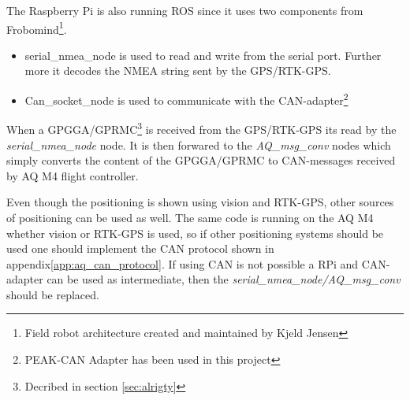 The Raspberry Pi is also running ROS since it uses two components from Frobomind\footnote{Field robot architecture created and maintained by Kjeld Jensen}. \begin{itemize}
	\item serial\_nmea\_node is used to read and write from the serial port. Further more it decodes the NMEA string sent by the GPS/RTK-GPS.
	\item Can\_socket\_node is used to communicate with the CAN-adapter\footnote{PEAK-CAN Adapter has been used in this project}
\end{itemize}

When a GPGGA/GPRMC\footnote{Decribed in section \ref{sec:alrigty}} is received from the GPS/RTK-GPS its read by the \textit{serial\_nmea\_node} node. It is then forwared to the \textit{AQ\_msg\_conv} nodes which simply converts the content of the GPGGA/GPRMC to CAN-messages received by AQ M4 flight controller.

Even though the positioning is shown using vision and RTK-GPS, other sources of positioning can be used as well. The same code is running on the AQ M4 whether vision or RTK-GPS is used, so if other positioning systems should be used one should implement the CAN protocol shown in appendix\ref{app:aq_can_protocol}. If using CAN is not possible a RPi and CAN-adapter can be used as intermediate, then the \textit{serial\_nmea\_node/AQ\_msg\_conv} should be replaced.

